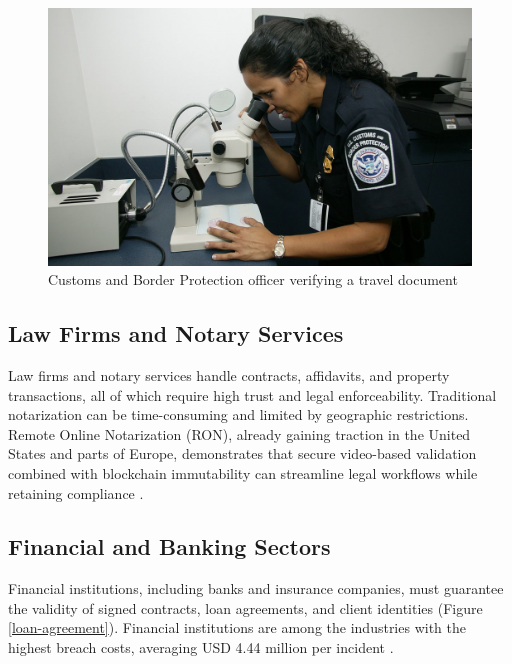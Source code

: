 \begin{figure}[H]
    \centering
    \includegraphics[width=18cm]{"images/cbp-travel-document.jpg"}
    \caption{Customs and Border Protection officer verifying a travel document}
    \label{cbp-travel-document}
\end{figure}

\subsection{Law Firms and Notary Services} 
Law firms and notary services handle contracts, affidavits, and property transactions, all of which require high trust and legal enforceability. Traditional notarization can be time-consuming and limited by geographic restrictions. Remote Online Notarization (RON), already gaining traction in the United States and parts of Europe, demonstrates  that secure video-based validation combined with blockchain immutability can 
streamline legal workflows while retaining compliance \cite{ncfa_canada_future_nodate}. 

\subsection{Financial and Banking Sectors} 
Financial institutions, including banks and insurance companies, must guarantee the  validity of signed contracts, loan agreements, and client identities (Figure \ref{loan-agreement}). Financial institutions are among the industries with the highest breach costs, averaging USD 4.44 million per incident \cite{accenture_state_nodate}.

